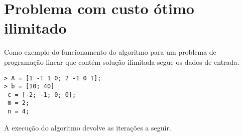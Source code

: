 \documentclass[
	12pt,				%
	openright,			%
	oneside,			%
	a4paper,			%
	english,			%
	french,				%
	spanish,			%
	brazil,				%
	]{abntex2}
\begin{document}
%
%
%
%
%
%  
  
\section{Problema com custo ótimo ilimitado}
Como exemplo do funcionamento do algoritmo para um problema de programação linear que contém solução ilimitada segue os dados de entrada.

\begin{verbatim}
> A = [1 -1 1 0; 2 -1 0 1];
> b = [10; 40]
 c = [-2; -1; 0; 0];
 m = 2;
 n = 4;
\end{verbatim}

A execução do algoritmo devolve as iterações a seguir. 
\end{document}
